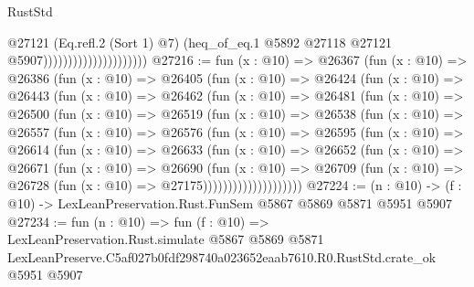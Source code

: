 \begin{lexlean}{RustStd}
\begin{coremodule}
                                            @27121
                                            (Eq.refl.{2} (Sort 1) @7)
                                            (heq_of_eq.{1}
                                              @5892
                                              @27118
                                              @27121
                                              @5907)))))))))))))))))))))
@27216 := fun (x : @10) =>
  @26367
    (fun (x : @10) =>
    @26386
      (fun (x : @10) =>
      @26405
        (fun (x : @10) =>
        @26424
          (fun (x : @10) =>
          @26443
            (fun (x : @10) =>
            @26462
              (fun (x : @10) =>
              @26481
                (fun (x : @10) =>
                @26500
                  (fun (x : @10) =>
                  @26519
                    (fun (x : @10) =>
                    @26538
                      (fun (x : @10) =>
                      @26557
                        (fun (x : @10) =>
                        @26576
                          (fun (x : @10) =>
                          @26595
                            (fun (x : @10) =>
                            @26614
                              (fun (x : @10) =>
                              @26633
                                (fun (x : @10) =>
                                @26652
                                  (fun (x : @10) =>
                                  @26671
                                    (fun (x : @10) =>
                                    @26690
                                      (fun (x : @10) =>
                                      @26709
                                        (fun (x : @10) =>
                                        @26728 (fun (x : @10) => @27175))))))))))))))))))))
@27224 := (n : @10) -> (f : @10) -> LexLeanPreservation.Rust.FunSem @5867 @5869 @5871 @5951 @5907
@27234 := fun (n : @10) =>
  fun (f : @10) =>
  LexLeanPreservation.Rust.simulate
    @5867
    @5869
    @5871
    LexLeanPreserve.C5af027b0fdf298740a023652eaab7610.R0.RustStd.crate_ok
    @5951
    @5907
\end{coremodule}
\end{lexlean}
